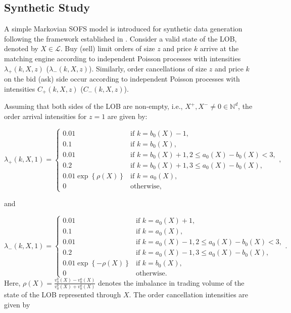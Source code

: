 \documentclass[10pt,a4paper,oneside]{article}
\newcommand{\Bo}{\mathcal{L}}
\begin{document}
\subsection{Synthetic Study}
\label{subsec:synthetic_study}

A simple Markovian SOFS model is introduced for synthetic data generation following the framework established in \cite{cont2023mathematical}. Consider a valid state of the LOB, denoted by $X \in \Bo$. Buy (sell) limit orders of size $z$ and price $k$ arrive at the matching engine according to independent Poisson processes with intensities $\lambda_{+}(k, X, z)$ ($\lambda_{-}(k, X, z)$). Similarly, order cancellations of size $z$ and price $k$ on the bid (ask) side occur according to independent Poisson processes with intensities $C_+(k, X, z)$ ($C_-(k, X, z)$).

Assuming that both sides of the LOB are non-empty, i.e., $X^+, X^- \neq 0 \in \mathbb{N}^d$, the order arrival intensities for $z=1$ are given by:

\[
    \lambda_+(k, X, 1) =
    \begin{cases}
        0.01                               & \text{if } k = b_0(X) - 1,                             \\
        0.1                                & \text{if } k = b_0(X),                                 \\
        0.01                               & \text{if } k = b_0(X) + 1, 2 \leq a_0(X) - b_0(X) < 3, \\
        0.2                                & \text{if } k = b_0(X) + 1, 3 \leq a_0(X) - b_0(X),     \\
        0.01 \exp \left\{ \rho(X) \right\} & \text{if } k = a_0(X),                                 \\
        0                                  & \text{otherwise,}
    \end{cases},
\]

and

\[
    \lambda_-(k, X, 1) =
    \begin{cases}
        0.01                                 & \text{if } k = a_0(X) + 1,                             \\
        0.1                                  & \text{if } k = a_0(X),                                 \\
        0.01                                 & \text{if } k = a_0(X) - 1, 2 \leq a_0(X) - b_0(X) < 3, \\
        0.2                                  & \text{if } k = a_0(X) - 1, 3 \leq a_0(X) - b_0(X),     \\
        0.01 \exp \left\{ - \rho(X) \right\} & \text{if } k = b_0(X),                                 \\
        0                                    & \text{otherwise.}
    \end{cases}.
\]
Here, $\rho(X) = \frac{v^b_0(X) - v^a_0(X)}{v^b_0(X) + v^a_0(X)}$ denotes the imbalance in trading volume of the state of the LOB represented through $X$. The order cancellation intensities are given by
\end{document}
